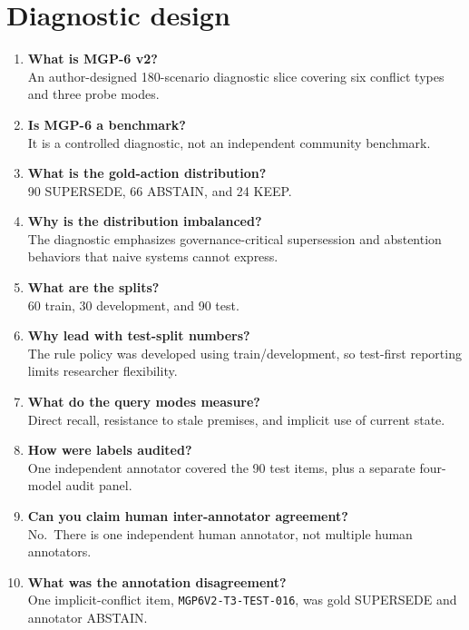 \section{Diagnostic design}\label{diagnostic-design}

\begin{enumerate}
\def\labelenumi{\arabic{enumi}.}
\setcounter{enumi}{10}
\item
  \textbf{What is MGP-6 v2?}\\
  An author-designed 180-scenario diagnostic slice covering six conflict
  types and three probe modes.
\item
  \textbf{Is MGP-6 a benchmark?}\\
  It is a controlled diagnostic, not an independent community benchmark.
\item
  \textbf{What is the gold-action distribution?}\\
  90 SUPERSEDE, 66 ABSTAIN, and 24 KEEP.
\item
  \textbf{Why is the distribution imbalanced?}\\
  The diagnostic emphasizes governance-critical supersession and
  abstention behaviors that naive systems cannot express.
\item
  \textbf{What are the splits?}\\
  60 train, 30 development, and 90 test.
\item
  \textbf{Why lead with test-split numbers?}\\
  The rule policy was developed using train/development, so test-first
  reporting limits researcher flexibility.
\item
  \textbf{What do the query modes measure?}\\
  Direct recall, resistance to stale premises, and implicit use of
  current state.
\item
  \textbf{How were labels audited?}\\
  One independent annotator covered the 90 test items, plus a separate
  four-model audit panel.
\item
  \textbf{Can you claim human inter-annotator agreement?}\\
  No.~There is one independent human annotator, not multiple human
  annotators.
\item
  \textbf{What was the annotation disagreement?}\\
  One implicit-conflict item, \texttt{MGP6V2-T3-TEST-016}, was gold
  SUPERSEDE and annotator ABSTAIN.
\end{enumerate}

